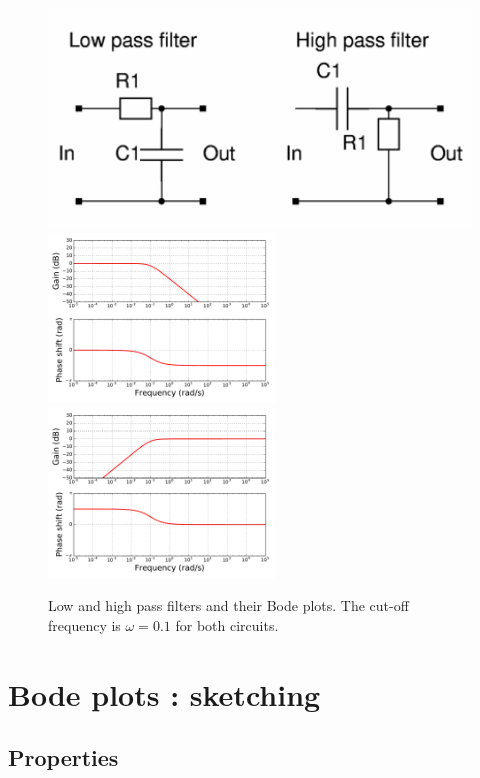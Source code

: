 \documentclass[a4paper,11pt]{report}
\theoremstyle{definition}
\begin{document}
\begin{figure}[H]
  \centering
  \includegraphics[width=12cm]{fig/low_high.png}\\
  \includegraphics[width=6cm]{fig/bode-low-pass.pdf}
  \includegraphics[width=6cm]{fig/bode-high-pass.pdf}
  \caption{Low and high pass filters and their Bode plots. The cut-off
    frequency is $\omega=0.1$ for both circuits.}
  \label{fig:low_high}
\end{figure}


\section{Bode plots : sketching}
\label{sec:bode-sketch}

\subsection{Properties}
\end{document}
